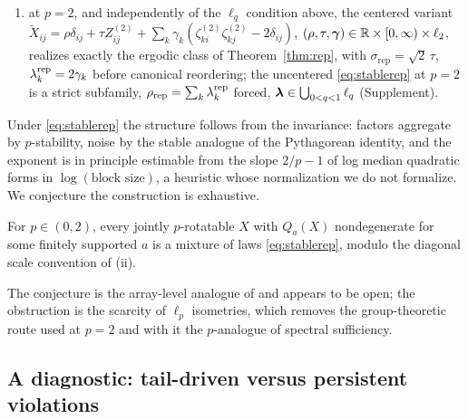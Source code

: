 \begin{theorem}
\begin{enumerate}[label=(\roman*),itemsep=1pt,topsep=2pt]
$\mathcal F^{(p)}_i$ generated by $(\zeta^{(p)}_{ki})_{k\ge1}$, the off-diagonal
row $(X_{ij})_{j\ne i}$ is i.i.d.\ $\SaS(S_i)$ with
\begin{equation}
\label{eq:conditional-row-scale}
S_i=\Bigl(\sigma^p+\sum_{k=1}^{\infty}|\lam_k\zeta^{(p)}_{ki}|^p\Bigr)^{1/p}
<\infty\quad\text{a.s.},
\end{equation}
with the conditional characteristic function displayed with the
proof: each row is an exchangeable common-scale mixture of an i.i.d.\ symmetric $p$-stable
sequence, the array-level counterpart of the
Bretagnolle--Dacunha-Castelle--Krivine representation;
\item at $p=2$, and independently of the $\ell_q$ condition above,
the centered variant
$\widetilde X_{ij}=\rho\delta_{ij}+\tau Z^{(2)}_{ij}
+\sum_k\gamma_k(\zeta^{(2)}_{ki}\zeta^{(2)}_{kj}-2\delta_{ij})$,
$(\rho,\tau,\bm{\gamma})\in\mathbb{R}\times[0,\infty)\times\ell_2$, realizes exactly
the ergodic class of Theorem~\ref{thm:rep}, with
$\sigma_{\mathrm{rep}}=\sqrt2\,\tau$, $\lambda^{\mathrm{rep}}_k=2\gamma_k$
before canonical reordering; the uncentered \eqref{eq:stablerep} at
$p=2$ is a strict subfamily, $\rho_{\mathrm{rep}}=\sum_k\lambda^{\mathrm{rep}}_k$
forced, $\bm{\lambda}\in\bigcup_{0<q<1}\ell_q$ (Supplement).
\end{enumerate}
\end{theorem}

Under \eqref{eq:stablerep} the structure follows from the invariance:
factors aggregate by $p$-stability, noise by the stable analogue of
the Pythagorean identity, and the exponent is in principle estimable
from the slope $2/p-1$ of log median quadratic forms in
$\log(\text{block size})$, a heuristic whose normalization we do not
formalize. We conjecture the
construction is exhaustive.

\begin{conjecture}[Completeness]
\label{conj:stable}
For $p\in(0,2)$, every jointly $p$-rotatable $X$ with $Q_a(X)$ nondegenerate for some
finitely supported $a$ is a mixture of laws \eqref{eq:stablerep},
modulo the diagonal scale convention of (ii).
\end{conjecture}

The conjecture is the array-level analogue of
\citet{bretagnolle1966lois} and appears to be open; the obstruction is
the scarcity of $\ell_p$ isometries, which removes the group-theoretic
route used at $p=2$ and with it the $p$-analogue of spectral
sufficiency.

\subsection{A diagnostic: tail-driven versus persistent violations}
\label{sec:diagnostic}

